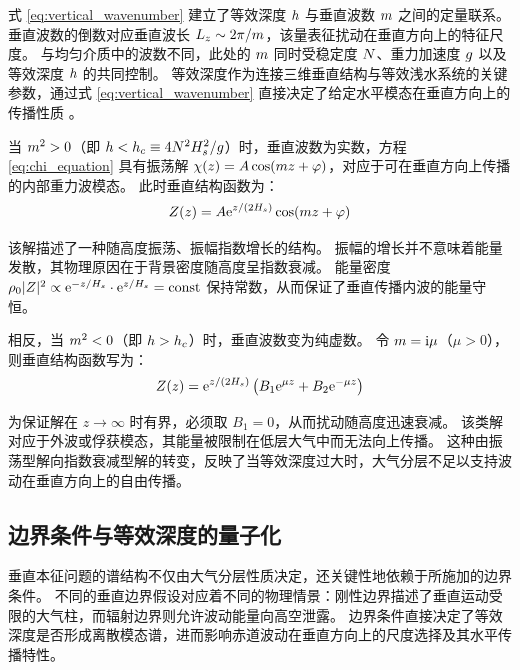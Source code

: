 式 \eqref{eq:vertical_wavenumber} 建立了等效深度 $h$ 与垂直波数 $m$ 之间的定量联系。
垂直波数的倒数对应垂直波长 $L_z \sim 2\pi/m$，该量表征扰动在垂直方向上的特征尺度。
与均匀介质中的波数不同，此处的 $m$ 同时受稳定度 $N$、重力加速度 $g$ 以及等效深度 $h$ 的共同控制。
等效深度作为连接三维垂直结构与等效浅水系统的关键参数，通过式 \eqref{eq:vertical_wavenumber} 直接决定了给定水平模态在垂直方向上的传播性质 \citep{hayashiTheoryLargeScaleEquatorial1970}。

当 $m^2 > 0$（即 $h < h_c \equiv 4N^2H_s^2/g$）时，垂直波数为实数，方程 \eqref{eq:chi_equation} 具有振荡解 $\chi(z) = A\cos(m z + \varphi)$，对应于可在垂直方向上传播的内部重力波模态。
此时垂直结构函数为：
\begin{equation}
    Z(z) = A \mathrm{e}^{z/(2H_s)} \cos(m z + \varphi)
    \label{eq:Z_oscillatory}
\end{equation}

该解描述了一种随高度振荡、振幅指数增长的结构。
振幅的增长并不意味着能量发散，其物理原因在于背景密度随高度呈指数衰减。
能量密度 $\rho_0 \lvert Z \rvert^2 \propto \mathrm{e}^{-z/H_s} \cdot \mathrm{e}^{z/H_s} = \mathrm{const}$ 保持常数，从而保证了垂直传播内波的能量守恒。

相反，当 $m^2 < 0$（即 $h > h_c$）时，垂直波数变为纯虚数。
令 $m = \mathrm{i}\mu$（$\mu > 0$），则垂直结构函数写为：
\begin{equation}
    Z(z) = \mathrm{e}^{z/(2H_s)} \left( B_1 \mathrm{e}^{\mu z} + B_2 \mathrm{e}^{-\mu z} \right)
    \label{eq:Z_evanescent}
\end{equation}

为保证解在 $z \to \infty$ 时有界，必须取 $B_1 = 0$，从而扰动随高度迅速衰减。
该类解对应于外波或俘获模态，其能量被限制在低层大气中而无法向上传播。
这种由振荡型解向指数衰减型解的转变，反映了当等效深度过大时，大气分层不足以支持波动在垂直方向上的自由传播。

\subsection{边界条件与等效深度的量子化}
\label{subsec:boundary_conditions}

垂直本征问题的谱结构不仅由大气分层性质决定，还关键性地依赖于所施加的边界条件。
不同的垂直边界假设对应着不同的物理情景：刚性边界描述了垂直运动受限的大气柱，而辐射边界则允许波动能量向高空泄露。
边界条件直接决定了等效深度是否形成离散模态谱，进而影响赤道波动在垂直方向上的尺度选择及其水平传播特性。

